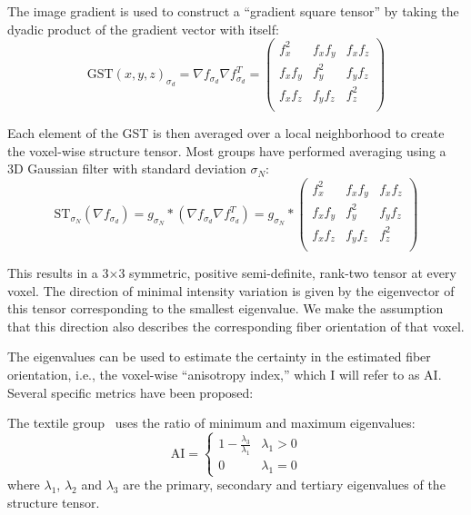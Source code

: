 \documentclass[11pt]{article}
\begin{document}
The image gradient is used to construct a ``gradient square tensor'' by taking
the dyadic product of the gradient vector with itself:
\begin{equation}
  \label{eq:GST}
  \text{GST}(x, y, z)_{\sigma_d} = \nabla f_{\sigma_d} \nabla f_{\sigma_d}^T =
  \begin{pmatrix}
    f_x^2 & f_x f_y & f_x f_z \\
    f_x f_y & f_y^2 & f_y f_z \\
    f_x f_z & f_y f_z & f_z^2 \\
  \end{pmatrix}
\end{equation}

Each element of the GST is then averaged over a local neighborhood to create the
voxel-wise structure tensor. Most groups have performed averaging using a 3D
Gaussian filter with standard deviation $\sigma_N$:
\begin{equation}
  \label{eq:ST}
  \text{ST}_{\sigma_N}\left(\nabla f_{\sigma_d}\right) = g_{\sigma_N} \ast
  \left(\nabla f_{\sigma_d} \nabla f_{\sigma_d}^T \right) = g_{\sigma_N} \ast
  \begin{pmatrix}
    f_x^2 & f_x f_y & f_x f_z \\
    f_x f_y & f_y^2 & f_y f_z \\
    f_x f_z & f_y f_z & f_z^2 \\
  \end{pmatrix}
\end{equation}

This results in a 3$\times$3 symmetric, positive semi-definite, rank-two tensor
at every voxel. The direction of minimal intensity variation is given by the
eigenvector of this tensor corresponding to the smallest eigenvalue. We make the
assumption that this direction also describes the corresponding fiber
orientation of that voxel.

The eigenvalues can be used to estimate the certainty in the estimated fiber
orientation, i.e., the voxel-wise ``anisotropy index,'' which I will refer to as
AI. Several specific metrics have been proposed:

The textile group~\cite{Straumit2015} uses the ratio of minimum and maximum
eigenvalues:
\begin{equation}
  \label{eq:eigratio}
  \text{AI} =
  \begin{cases}
    1 - \frac{\lambda_3}{\lambda_1} & \lambda_1 > 0\\
    0 & \lambda_1 = 0
  \end{cases}
\end{equation}
where $\lambda_1$, $\lambda_2$ and $\lambda_3$ are the primary, secondary and
tertiary eigenvalues of the structure tensor.
\end{document}
